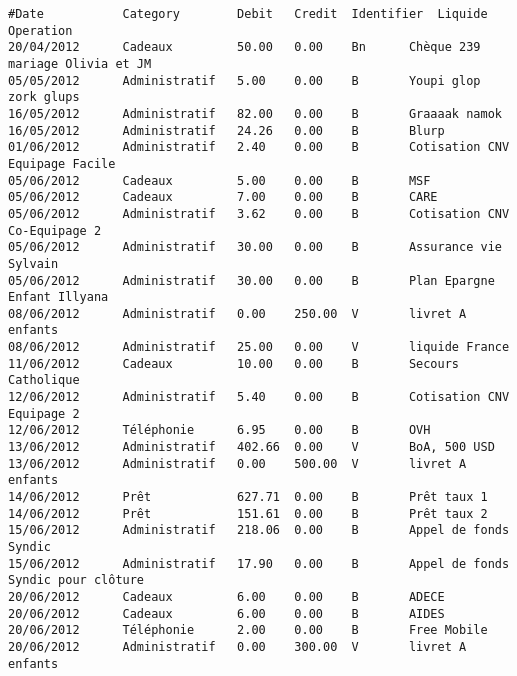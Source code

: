 \linenumbers
\footnotesize
\begin{verbatim}
#Date           Category        Debit   Credit  Identifier  Liquide Operation
20/04/2012      Cadeaux         50.00   0.00    Bn      Chèque 239 mariage Olivia et JM
05/05/2012      Administratif   5.00    0.00    B       Youpi glop zork glups
16/05/2012      Administratif   82.00   0.00    B       Graaaak namok
16/05/2012      Administratif   24.26   0.00    B       Blurp
01/06/2012      Administratif   2.40    0.00    B       Cotisation CNV Equipage Facile
05/06/2012      Cadeaux         5.00    0.00    B       MSF
05/06/2012      Cadeaux         7.00    0.00    B       CARE
05/06/2012      Administratif   3.62    0.00    B       Cotisation CNV Co-Equipage 2
05/06/2012      Administratif   30.00   0.00    B       Assurance vie Sylvain
05/06/2012      Administratif   30.00   0.00    B       Plan Epargne Enfant Illyana
08/06/2012      Administratif   0.00    250.00  V       livret A enfants
08/06/2012      Administratif   25.00   0.00    V       liquide France
11/06/2012      Cadeaux         10.00   0.00    B       Secours Catholique
12/06/2012      Administratif   5.40    0.00    B       Cotisation CNV Equipage 2
12/06/2012      Téléphonie      6.95    0.00    B       OVH
13/06/2012      Administratif   402.66  0.00    V       BoA, 500 USD
13/06/2012      Administratif   0.00    500.00  V       livret A enfants
14/06/2012      Prêt            627.71  0.00    B       Prêt taux 1
14/06/2012      Prêt            151.61  0.00    B       Prêt taux 2
15/06/2012      Administratif   218.06  0.00    B       Appel de fonds Syndic
15/06/2012      Administratif   17.90   0.00    B       Appel de fonds Syndic pour clôture
20/06/2012      Cadeaux         6.00    0.00    B       ADECE
20/06/2012      Cadeaux         6.00    0.00    B       AIDES
20/06/2012      Téléphonie      2.00    0.00    B       Free Mobile
20/06/2012      Administratif   0.00    300.00  V       livret A enfants
\end{verbatim}
\nolinenumbers
\normalsize
